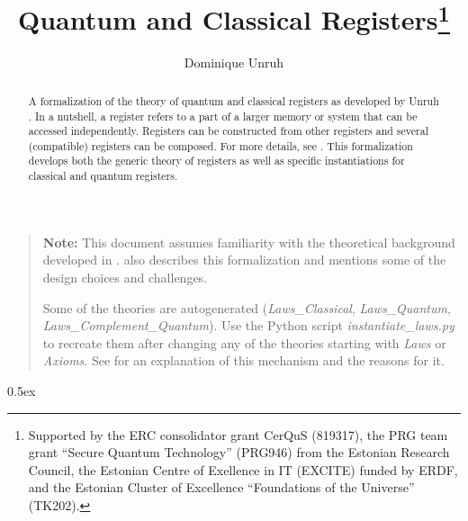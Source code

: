 \documentclass{article}
\begin{document}
\title{Quantum and Classical Registers\thanks{Supported by the ERC consolidator grant CerQuS (819317), the PRG team grant “Secure Quantum Technology” (PRG946) from the Estonian Research Council, the Estonian Centre of Exellence in IT (EXCITE) funded by ERDF, and the Estonian Cluster of Excellence ``Foundations of the Universe'' (TK202).}}
\author{Dominique Unruh}
\maketitle

\begin{abstract}
  A formalization of the theory of quantum and classical registers as
  developed by Unruh \cite{unruh21registers}. In a nutshell, a
  register refers to a part of a larger memory or system that can be
  accessed independently.  Registers can be constructed from other
  registers and several (compatible) registers can be composed. For
  more details, see \cite{unruh21registers}. This formalization
  develops both the generic theory of registers as well as specific
  instantiations for classical and quantum registers.
\end{abstract}

\bigskip
\bigskip

\begin{quote}
  \textbf{Note:} This document assumes familiarity with the theoretical background developed in \cite{unruh21registers}.
  \cite{unruh21registers} also describes this formalization and mentions some of the design choices and challenges.

  Some of the theories are autogenerated (\textit{Laws\_Classical}, \textit{Laws\_Quantum}, \textit{Laws\_Complement\_Quantum}).
  Use the Python script \textit{instantiate\_laws.py} to recreate them after changing any of the theories starting with \textit{Laws} or \textit{Axioms}.
  See \cite{unruh21registers} for an explanation of this mechanism and the reasons for it.
\end{quote}

\tableofcontents

\parindent 0pt\parskip 0.5ex





\end{document}
